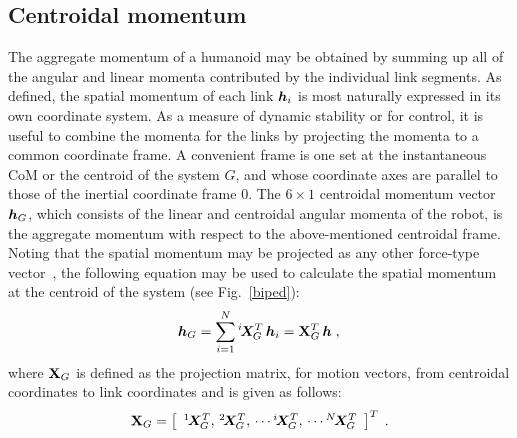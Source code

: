 \documentclass{llncs}
\newcommand{\bA}{\mbox{\boldmath $A$}}
\newcommand{\bh}{\mbox{\boldmath $h$}}
\newcommand{\bq}{\mbox{\boldmath $q$}}
\newcommand{\bqd}{\dot{\bq}}
\newcommand{\vX}{\vec{X}}
\newcommand{\bX}{{\bf X}}
\newcommand{\XM}[2]{{}^{#1}\!\vX_{\!#2}}
\begin{document}
\subsection{Centroidal momentum}

The aggregate momentum of a humanoid may be obtained by summing up all of the angular and linear momenta contributed by the individual link segments. 
As defined, the spatial momentum of each link $\bh_i$ is most
naturally expressed in its own coordinate system.  As a measure of
dynamic stability or for control, it is useful to combine the
momenta for the links by projecting the momenta to a common
coordinate frame.  A convenient frame is one set at the
instantaneous CoM or the centroid of the system
$G$, and whose coordinate axes are parallel to those of the inertial coordinate frame 0.
The $6\times 1$ centroidal momentum vector $\bh_G$, which
consists of the linear and centroidal angular momenta of the robot, is the aggregate momentum with respect to the above-mentioned centroidal frame.
Noting that the spatial momentum may be projected as any other
force-type vector~\cite{FeOr08}, the following equation may be used to calculate
the spatial momentum at the centroid of the system (see Fig.~\ref{biped}):
%
\begin{equation}\label{hgt}
\bh_G = \sum_{i=1}^N  \XM{i}{G}^T \, \bh_i = \bX_G^T \, \bh \; ,\\%
\end{equation}
%
%
where $\bX_G$ is defined as the projection matrix, for motion vectors,
from centroidal coordinates to link coordinates and is given as follows:
%
\begin{equation}
\bX_G = \left[ \begin{array}{c} \XM{1}{G}^T, \, \XM{2}{G}^T, \,
\cdots \XM{i}{G}^T, \, \cdots \XM{N}{G}^T \end{array} \right]^T \; .
\end{equation}
%
\end{document}
